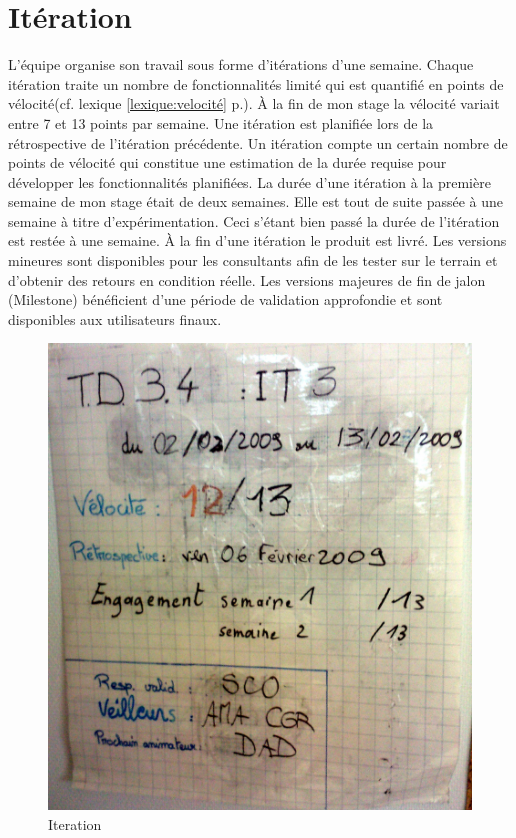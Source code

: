 \section{Itération}
L'équipe organise son travail sous forme d'itérations d'une semaine. Chaque itération traite un nombre de fonctionnalités limité qui est quantifié en points de vélocité(cf. lexique \ref{lexique:velocité} p.\pageref{lexique:velocité}). À la fin de mon stage la vélocité variait entre 7 et 13 points par semaine. Une itération est planifiée lors de la rétrospective de l'itération précédente. Un itération compte un certain nombre de points de vélocité qui constitue une estimation de la durée requise pour développer les fonctionnalités planifiées. La durée d'une itération à la première semaine de mon stage était de deux semaines. Elle est tout de suite passée à une semaine à titre d'expérimentation. Ceci s'étant bien passé la durée de l'itération est restée à une semaine. À la fin d'une itération le produit est livré. Les versions mineures sont disponibles pour les consultants afin de les tester sur le terrain et d'obtenir des retours en condition réelle. Les versions majeures de fin de jalon (Milestone) bénéficient d'une période de validation approfondie et sont disponibles aux utilisateurs finaux.
\begin{figure}[!ht]
\centering
\includegraphics[scale=0.10]{Illustrations/SP_A0182.jpg}
\caption{Iteration}
\label{fig:Iteration}
\end{figure}
